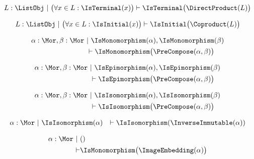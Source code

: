 \begin{sequent}
\begin{align*}
  L: \ListObj ~|~ \big(\forall x \in L: \IsTerminal(x)\big) \vdash \IsTerminal\big( \DirectProduct( L ) \big)
\end{align*}
\end{sequent}

\begin{sequent}
\begin{align*}
  L: \ListObj ~|~ \big(\forall x \in L: \IsInitial(x)\big) \vdash \IsInitial\big( \Coproduct( L ) \big)
\end{align*}
\end{sequent}

\begin{sequent}
\begin{align*}
 \alpha:\Mor, \beta:\Mor ~&|~ \IsMonomorphism( \alpha ), \IsMonomorphism( \beta )  \\
 &\vdash \IsMonomorphism\big( \PreCompose( \alpha, \beta ) \big)
\end{align*}
\end{sequent}

\begin{sequent}
\begin{align*}
 \alpha:\Mor, \beta:\Mor ~&|~ \IsEpimorphism( \alpha ), \IsEpimorphism( \beta )  \\
 &\vdash \IsEpimorphism\big( \PreCompose( \alpha, \beta ) \big)
\end{align*}
\end{sequent}

\begin{sequent}
\begin{align*}
 \alpha:\Mor, \beta:\Mor ~&|~ \IsIsomorphism( \alpha ), \IsIsomorphism( \beta )  \\
 &\vdash \IsIsomorphism\big( \PreCompose( \alpha, \beta ) \big)
\end{align*}
\end{sequent}

\begin{sequent}
\begin{align*}
 \alpha:\Mor ~&|~ \IsIsomorphism( \alpha ) &\vdash \IsIsomorphism( \InverseImmutable( \alpha ) )
\end{align*}
\end{sequent}

\begin{sequent}
\begin{align*}
  \alpha:\Mor~|~ & () \\
  \vdash &\IsMonomorphism\big( \ImageEmbedding( \alpha ) \big)
\end{align*}
\end{sequent}
